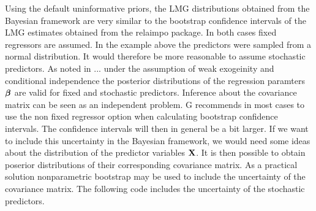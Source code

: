 \documentclass[11pt,a4paper,twoside]{book}
\begin{document}
Using the default uninformative priors, the LMG distributions obtained from the Bayesian framework are very similar to the bootstrap confidence intervals of the LMG estimates obtained from the relaimpo package. In both cases fixed regressors are assumed. In the example above the predictors were sampled from a normal distribution. It would therefore be more reasonable to assume stochastic predictors. As noted in ... under the assumption of weak exogeinity and conditional independence the posterior distributions of the regression paramters ${\boldsymbol{\beta}}$ are valid for fixed and stochastic predictors. Inference about the covariance matrix can be seen as an independent problem. G recommends in most cases to use the non fixed regressor option when calculating bootstrap confidence intervals. The confidence intervals will then in general be a bit larger. If we want to include this uncertainty in the Bayesian framework, we would need some ideas about the distribution of the predictor variables ${\mathbf{X}}$. It is then possible to obtain poserior distributions of their corresponding covariance matrix. As a practical solution nonparametric bootstrap may be used to include the uncertainty of the covariance matrix. The following code includes the uncertainty of the stochastic predictors. 
\end{document}
